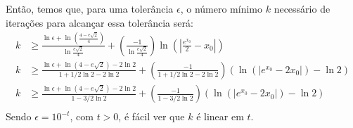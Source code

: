 \documentclass{article}
\begin{document}
    Então, temos que, para uma tolerância $\epsilon$, o número mínimo $k$ necessário de iterações para alcançar essa tolerância será:
    \begin{align*}
        k &\geq \frac{\ln \epsilon + \ln(\frac{4 - e\sqrt{2}}{4})}{\ln \frac{e\sqrt{2}}{4}} +
        \left(\frac{-1}{\ln \frac{e\sqrt{2}}{4}}\right){\ln(|\frac{e^{x_0}}{2} - x_0|)}\\
        k &\geq \frac{\ln \epsilon + \ln(4 - e\sqrt{2}) - 2\ln 2}{1 + 1/2 \ln 2 - 2 \ln 2} +
        \left(\frac{-1}{1 + 1/2 \ln 2 - 2 \ln 2}\right)(\ln(|e^{x_0} - 2x_0|) - \ln 2)\\
        k &\geq \frac{\ln \epsilon + \ln(4 - e\sqrt{2}) - 2\ln 2}{1 - 3/2 \ln 2} +
        \left(\frac{-1}{1 - 3/2 \ln 2}\right)(\ln(|e^{x_0} - 2x_0|) - \ln 2)\\
    \end{align*}
    Sendo $\epsilon = 10^{-t}$, com $t > 0$, é fácil ver que $k$ é linear em $t$.
\end{document}
